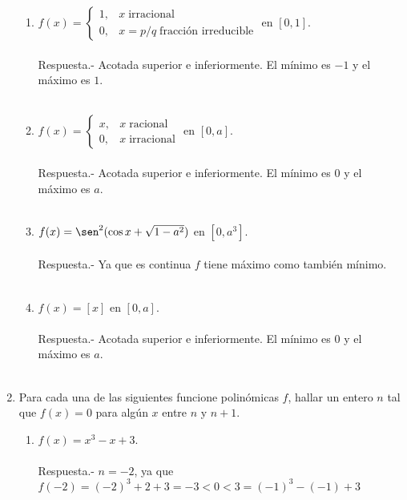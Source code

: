 \begin{enumerate}[\bfseries 1.]
\begin{enumerate}[\bfseries (i)]
	\item $f(x) = \left\{\begin{array}{ll}1, & x \; \mbox{irracional} \\ 0, & x=p/q\; \mbox{fracción irreducible}\end{array}\right.$ en $[0,1]$.\\\\
	    Respuesta.-\; Acotada superior e inferiormente. El mínimo es $-1$ y el máximo es $1$.\\\\

	\item $f(x) = \left\{ \begin{array}{ll} x, & x\; \mbox{racional} \\ 0, & x\; \mbox{irracional}\end{array} \right.$ en $[0,a]$.\\\\
		Respuesta.-\; Acotada superior e inferiormente. El mínimo es $0$ y el máximo es $a$.\\\\

	\item $f(x) = \sen^2(\cos x + \sqrt{1-a^2})$ en $[0,a^3]$.\\\\
	    Respuesta.-\; Ya que es continua $f$ tiene máximo como también mínimo.\\\\

	\item $f(x)=[x]$ en $[0,a]$.\\\\
	    Respuesta.-\; Acotada superior e inferiormente. El mínimo es $0$ y el máximo es $a$.\\\\

    \end{enumerate}

\item Para cada una de las siguientes funcione polinómicas $f$, hallar un entero $n$ tal que $f(x)=0$ para algún $x$ entre $n$ y $n+1$.\\
    \begin{enumerate}[\bfseries (i)]

	\item $f(x)=x^3-x+3$.\\\\
	    Respuesta.-\; $n=-2$, ya que $f(-2) = (-2)^3+2+3 = -3 < 0 <  3 =  (-1)^3 - (-1) + 3$\\\\


\end{enumerate}
\end{enumerate}
